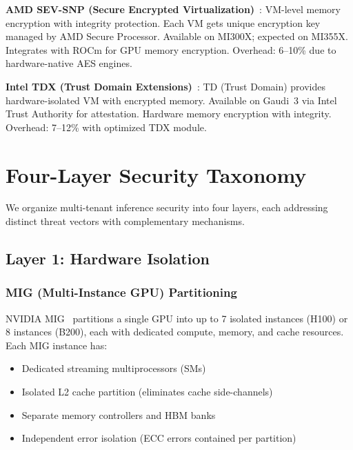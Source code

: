 \documentclass[conference,10pt]{IEEEtran}
\begin{document}
\textbf{AMD SEV-SNP (Secure Encrypted Virtualization)}~\cite{amd2024sevsnp}: VM-level memory encryption with integrity protection. Each VM gets unique encryption key managed by AMD Secure Processor. Available on MI300X; expected on MI355X. Integrates with ROCm for GPU memory encryption. Overhead: 6--10\% due to hardware-native AES engines.

\textbf{Intel TDX (Trust Domain Extensions)}~\cite{intel2024tdx}: TD (Trust Domain) provides hardware-isolated VM with encrypted memory. Available on Gaudi~3 via Intel Trust Authority for attestation. Hardware memory encryption with integrity. Overhead: 7--12\% with optimized TDX module.

\section{Four-Layer Security Taxonomy}
\label{sec:taxonomy}

We organize multi-tenant inference security into four layers, each addressing distinct threat vectors with complementary mechanisms.

\subsection{Layer 1: Hardware Isolation}

\subsubsection{MIG (Multi-Instance GPU) Partitioning}

NVIDIA MIG~\cite{nvidia2024mig} partitions a single GPU into up to 7 isolated instances (H100) or 8 instances (B200), each with dedicated compute, memory, and cache resources. Each MIG instance has:

\begin{itemize}
\item Dedicated streaming multiprocessors (SMs)
\item Isolated L2 cache partition (eliminates cache side-channels)
\item Separate memory controllers and HBM banks
\item Independent error isolation (ECC errors contained per partition)
\end{itemize}
\end{document}
